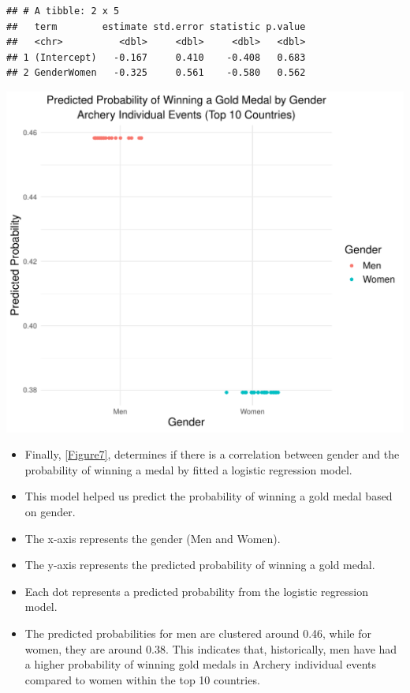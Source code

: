 \documentclass[12pt,preprint, authoryear]{elsarticle}
\let\origfigure\figure
\let\endorigfigure\endfigure
\renewenvironment{figure}[1][2] {
    \expandafter\origfigure\expandafter[H]
} {
    \endorigfigure
}
\numberwithin{equation}{section}
\numberwithin{figure}{section}
\numberwithin{table}{section}
\begin{document}
\begin{verbatim}
## # A tibble: 2 x 5
##   term        estimate std.error statistic p.value
##   <chr>          <dbl>     <dbl>     <dbl>   <dbl>
## 1 (Intercept)   -0.167     0.410    -0.408   0.683
## 2 GenderWomen   -0.325     0.561    -0.580   0.562
\end{verbatim}

\begin{figure}

{\centering \includegraphics{README_files/figure-latex/unnamed-chunk-7-1} 

}

\caption{The Top Countries that Dominate in both the Summer and Winter Olympics\label{Figure7}}\label{fig:unnamed-chunk-7}
\end{figure}

\begin{itemize}
\item
  Finally, \ref{Figure7}, determines if there is a correlation between
  gender and the probability of winning a medal by fitted a logistic
  regression model.
\item
  This model helped us predict the probability of winning a gold medal
  based on gender.
\item
  The x-axis represents the gender (Men and Women).
\item
  The y-axis represents the predicted probability of winning a gold
  medal.
\item
  Each dot represents a predicted probability from the logistic
  regression model.
\item
  The predicted probabilities for men are clustered around 0.46, while
  for women, they are around 0.38. This indicates that, historically,
  men have had a higher probability of winning gold medals in Archery
  individual events compared to women within the top 10 countries.
\end{itemize}


\end{document}
